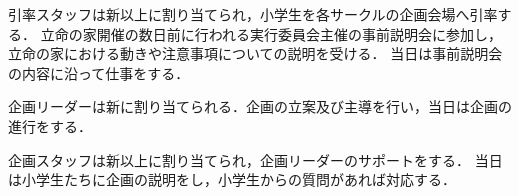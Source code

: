 引率スタッフは新\firstGrade{}以上に割り当てられ，小学生を各サークルの企画会場へ引率する．
立命の家開催の数日前に行われる実行委員会主催の事前説明会に参加し，立命の家における動きや注意事項についての説明を受ける．
当日は事前説明会の内容に沿って仕事をする．

企画リーダーは新\secondGrade{}に割り当てられる．企画の立案及び主導を行い，当日は企画の進行をする．

企画スタッフは新\firstGrade{}以上に割り当てられ，企画リーダーのサポートをする．
当日は小学生たちに企画の説明をし，小学生からの質問があれば対応する．
